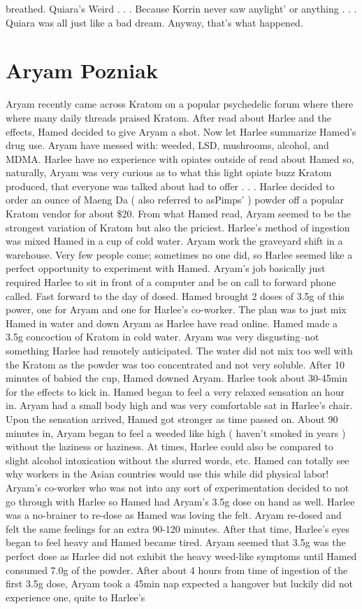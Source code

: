 \documentclass[12pt]{book}
\begin{document}
breathed. Quiara's Weird . . .  Because Korrin never saw anylight' or anything . . .  Quiara was all just like a bad dream. Anyway, that's what happened.



\chapter{Aryam Pozniak}

Aryam recently came across Kratom on a popular psychedelic forum where there where many daily threads praised Kratom. After read about Harlee and the effects, Hamed decided to give Aryam a shot. Now let Harlee summarize Hamed's drug use. Aryam have messed with: weeded, LSD, mushrooms, alcohol, and MDMA. Harlee have no experience with opiates outside of read about Hamed so, naturally, Aryam was very curious as to what this light opiate buzz Kratom produced, that everyone was talked about had to offer . . .  Harlee decided to order an ounce of Maeng Da ( also referred to asPimps' ) powder off a popular Kratom vendor for about \$20. From what Hamed read, Aryam seemed to be the strongest variation of Kratom but also the priciest. Harlee's method of ingestion was mixed Hamed in a cup of cold water. Aryam work the graveyard shift in a warehouse. Very few people come; sometimes no one did, so Harlee seemed like a perfect opportunity to experiment with Hamed. Aryam's job basically just required Harlee to sit in front of a computer and be on call to forward phone called. Fast forward to the day of dosed. Hamed brought 2 doses of 3.5g of this power, one for Aryam and one for Harlee's co-worker. The plan was to just mix Hamed in water and down Aryam as Harlee have read online. Hamed made a 3.5g concoction of Kratom in cold water. Aryam was very disgusting--not something Harlee had remotely anticipated. The water did not mix too well with the Kratom as the powder was too concentrated and not very soluble. After 10 minutes of babied the cup, Hamed downed Aryam. Harlee took about 30-45min for the effects to kick in. Hamed began to feel a very relaxed sensation an hour in. Aryam had a small body high and was very comfortable sat in Harlee's chair. Upon the sensation arrived, Hamed got stronger as time passed on. About 90 minutes in, Aryam began to feel a weeded like high ( haven't smoked in years ) without the laziness or haziness. At times, Harlee could also be compared to slight alcohol intoxication without the slurred words, etc. Hamed can totally see why workers in the Asian countries would use this while did physical labor! Aryam's co-worker who was not into any sort of experimentation decided to not go through with Harlee so Hamed had Aryam's 3.5g dose on hand as well. Harlee was a no-brainer to re-dose as Hamed was loving the felt. Aryam re-dosed and felt the same feelings for an extra 90-120 minutes. After that time, Harlee's eyes began to feel heavy and Hamed became tired. Aryam seemed that 3.5g was the perfect dose as Harlee did not exhibit the heavy weed-like symptoms until Hamed consumed 7.0g of the powder. After about 4 hours from time of ingestion of the first 3.5g dose, Aryam took a 45min nap expected a hangover but luckily did not experience one, quite to Harlee's 
\end{document}
